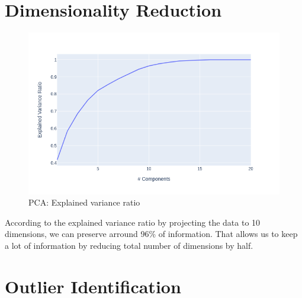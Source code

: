 \documentclass[sigconf]{acmart}
\begin{document}
\section{Dimensionality Reduction}
\begin{figure}[h]
    \includegraphics[width=\linewidth]{pca.png}
    \centering
    \caption{PCA: Explained variance ratio}
\end{figure}

According to the explained variance ratio by projecting the data to 10 dimensions, we can preserve arround 96\% of information. That allows us to keep a lot of information by reducing total number of dimensions by half.

\section{Outlier Identification}
\end{document}
